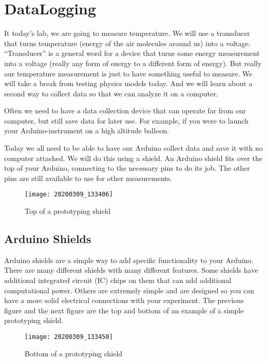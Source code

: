 \chapter{DataLogging}
It today's lab, we are going to measure temperature. We will use a transducer that turns temperature (energy of the air molecules around us) into a voltage. ``Transducer'' is a general word for a device that turns some energy measurement into a voltage (really any form of energy to a different form of energy).  But really our temperature measurement is just to have something useful to measure. We will take a break from testing physics models today. And we will learn about a second way to collect data so that we can analyze it on a computer. 

Often we need to have a data collection device that can operate far from our computer, but still save data for later use. For example, if you were to launch your Arduino-instrument on a high altitude balloon.

Today we all need to be able to have our Arduino collect data and save it with no computer attached. We will do this using a shield. An Arduino shield fits over the top of your Arduino, connecting to the necessary pins to do its job. The other pins are still available to use for other measurements. 

\begin{figure}[h!] 
	\centering
	\caption{Top of a prototyping shield}
	\texttt{[image: 20200309\_133406]}
\end{figure}

\section{Arduino Shields}
	Arduino shields are a simple way to add specific functionality to your Arduino. There are many different shields with many different features. Some shields have additional integrated circuit (IC) chips on them that can add additional computational power.  Others are extremely simple and are designed so you can have a more solid electrical connections with your experiment.  The previous figure and the next figure are the top and bottom of an example of a simple prototyping shield.

	\begin{figure}[h!] 
		\centering
		\caption{Bottom of a prototyping shield}
		\texttt{[image: 20200309\_133450]}
	\end{figure}
	
